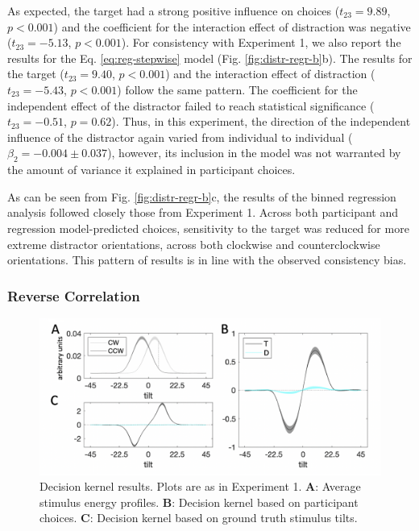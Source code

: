 \documentclass[a4paper, nobind]{templates/ociamthesis}
\begin{document}
As expected, the target had a strong positive influence on choices (\(t_{23}=9.89\), \(p<0.001\)) and the coefficient for the interaction effect of distraction was negative (\(t_{23}=-5.13\), \(p<0.001\)). For consistency with Experiment 1, we also report the results for the Eq. \eqref{eq:reg-stepwise} model (Fig. \ref{fig:distr-regr-b}b). The results for the target (\(t_{23}=9.40\), \(p<0.001\)) and the interaction effect of distraction (\(t_{23}=-5.43\), \(p<0.001\)) follow the same pattern. The coefficient for the independent effect of the distractor failed to reach statistical significance (\(t_{23}=-0.51\), \(p=0.62\)). Thus, in this experiment, the direction of the independent influence of the distractor again varied from individual to individual (\(\beta_2=-0.004 \pm 0.037\)), however, its inclusion in the model was not warranted by the amount of variance it explained in participant choices.

As can be seen from Fig. \ref{fig:distr-regr-b}c, the results of the binned regression analysis followed closely those from Experiment 1. Across both participant and regression model-predicted choices, sensitivity to the target was reduced for more extreme distractor orientations, across both clockwise and counterclockwise orientations. This pattern of results is in line with the observed consistency bias.

\hypertarget{reverse-correlation-2}{%
\subsubsection{Reverse Correlation}\label{reverse-correlation-2}}

\begin{figure}

{\centering \includegraphics[width=1\linewidth]{figures/distr-kernels-b} 

}

\caption[Experiment 2, Decision kernel results]{Decision kernel results. Plots are as in Experiment 1. $\textbf{A:}$ Average stimulus energy profiles. $\textbf{B:}$ Decision kernel based on participant choices. $\textbf{C:}$ Decision kernel based on ground truth stimulus tilts.}\label{fig:distr-kernels-b}
\end{figure}
\end{document}
